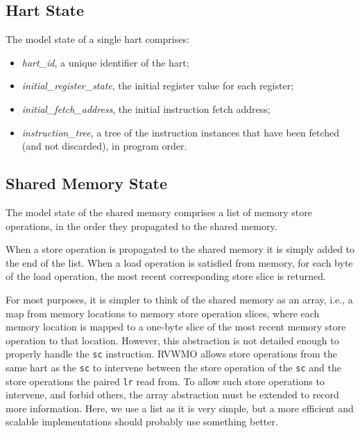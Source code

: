 \subsection{Hart State}
The model state of a single hart comprises:
\begin{itemize}
\item {\it hart\_id}, a unique identifier of the hart;
\item {\it initial\_register\_state}, the initial register value for each register;
\item {\it initial\_fetch\_address}, the initial instruction fetch address;
\item {\it instruction\_tree}, a tree of the instruction instances that have been fetched (and not discarded), in program order.
\end{itemize}


\subsection{Shared Memory State}
The model state of the shared memory comprises a list of memory store operations, in the order they propagated to the shared memory.

When a store operation is propagated to the shared memory it is simply added to the end of the list.
When a load operation is satisfied from memory, for each byte of the load operation, the most recent corresponding store slice is returned.

\begin{commentary}
For most purposes, it is simpler to think of the shared memory as an array, i.e., a map from memory locations to memory store operation slices, where each memory location is mapped to a one-byte slice of the most recent memory store operation to that location.
However, this abstraction is not detailed enough to properly handle the {\tt sc} instruction.
RVWMO allows store operations from the same hart as the {\tt sc} to intervene between the store operation of the {\tt sc} and the store operations the paired {\tt lr} read from.
To allow such store operations to intervene, and forbid others, the array abstraction must be extended to record more information.
Here, we use a list as it is very simple, but a more efficient and scalable implementations should probably use something better.
\end{commentary}


